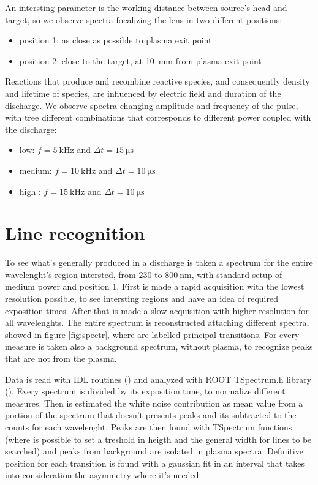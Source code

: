 An intersting parameter is the working distance between source's head and target, so we observe spectra focalizing the lens in two different positions:
\begin{itemize}
 \item position 1: as close as possible to plasma exit point
 \item position 2: close to the target, at \SI{10}{\milli\meter} from plasma exit point
\end{itemize}

Reactions that produce and recombine reactive species, and consequently density and lifetime of species, are influenced by electric field and duration of the discharge. We observe spectra changing amplitude and frequency of the pulse, with tree different combinations that corresponds to different power coupled with the discharge:
\begin{itemize}
 \item low: $f = \SI{5}{\kilo\hertz}$ and $\Delta t = \SI{15}{\micro\second}$
 \item medium: $f = \SI{10}{\kilo\hertz}$ and $\Delta t = \SI{10}{\micro\second}$
 \item high : $f = \SI{15}{\kilo\hertz}$ and $\Delta t = \SI{10}{\micro\second}$
\end{itemize}


\section{Line recognition}
To see what's generally produced in a discharge is taken a spectrum for the entire wavelenght's region intersted, from $\num{230}$ to $\SI{800}{\nano\meter}$, with standard setup of medium power and position 1.
First is made a rapid acquisition with the lowest resolution possible, to see intersting regions and have an idea of required exposition times. After that is made a slow acquisition with higher resolution for all wavelenghts. The entire spectrum is reconstructed attaching different spectra, showed in figure \ref{fig:spectr}, where are labelled principal transitions.
For every measure is taken also a background spectrum, without plasma, to recognize peaks that are not from the plasma.

Data is read with IDL routines (\cite{GUMLEY200215}) and analyzed with ROOT TSpectrum.h library (\cite{ROOT:TSpectrum}). Every spectrum is divided by its exposition time, to normalize different measures. Then is estimated the white noise contribution as mean value from a portion of the spectrum that doesn't presents peaks and its subtracted to the counts for each wavelenght. Peaks are then found with TSpectrum functions (where is possible to set a treshold in heigth and the general width for lines to be searched) and peaks from background are isolated in plasma spectra. Definitive position for each transition is found with a gaussian fit in an interval that takes into consideration the asymmetry where it's needed.

